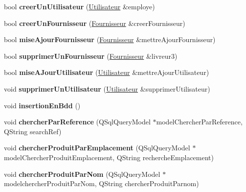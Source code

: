 \begin{DoxyCompactItemize}
bool {\bfseries creer\+Un\+Utilisateur} (\mbox{\hyperlink{class_utilisateur}{Utilisateur}} \&employe)
\item 
\mbox{\label{class_base_de_donnees_a81715fc3632e6533d9c66a66c62e897b}} 
bool {\bfseries creer\+Un\+Fournisseur} (\mbox{\hyperlink{class_fournisseur}{Fournisseur}} \&creer\+Fournisseur)
\item 
\mbox{\label{class_base_de_donnees_ab49e6dfff0eecf616d9a7642ea358f31}} 
bool {\bfseries mise\+Ajour\+Fournisseur} (\mbox{\hyperlink{class_fournisseur}{Fournisseur}} \&mettre\+Ajour\+Fournisseur)
\item 
\mbox{\label{class_base_de_donnees_a90ac8e5f412153ce4ab5a4c7a603f5e9}} 
bool {\bfseries supprimer\+Un\+Fournisseur} (\mbox{\hyperlink{class_fournisseur}{Fournisseur}} \&livreur3)
\item 
\mbox{\label{class_base_de_donnees_a9c2bce97f39046e66b3dd3d08c2b911a}} 
bool {\bfseries mise\+A\+Jour\+Utilisateur} (\mbox{\hyperlink{class_utilisateur}{Utilisateur}} \&mettre\+Ajour\+Utilisateur)
\item 
\mbox{\label{class_base_de_donnees_a7ead23bc4e5d3bc897d9c6a412bbc0a6}} 
void {\bfseries supprimer\+Un\+Utilisateur} (\mbox{\hyperlink{class_utilisateur}{Utilisateur}} \&supprimer\+Utilisateur)
\item 
\mbox{\label{class_base_de_donnees_a1aa6b997245767e4ba75973d59dcfaf6}} 
void {\bfseries insertion\+En\+Bdd} ()
\item 
\mbox{\label{class_base_de_donnees_aaa4a62ca5864ce24cb0b3d488a609811}} 
void {\bfseries chercher\+Par\+Reference} (Q\+Sql\+Query\+Model $\ast$model\+Chercher\+Par\+Reference, Q\+String search\+Ref)
\item 
\mbox{\label{class_base_de_donnees_a7741ad517714e619d7f8a0f202d3b38d}} 
void {\bfseries chercher\+Produit\+Par\+Emplacement} (Q\+Sql\+Query\+Model $\ast$model\+Chercher\+Produit\+Emplacement, Q\+String recherche\+Emplacement)
\item 
\mbox{\label{class_base_de_donnees_a49d9a59025c2342adc820849bffb5532}} 
void {\bfseries chercher\+Produit\+Par\+Nom} (Q\+Sql\+Query\+Model $\ast$modelchercher\+Produit\+Par\+Nom, Q\+String chercher\+Produit\+Parnom)
\end{DoxyCompactItemize}
